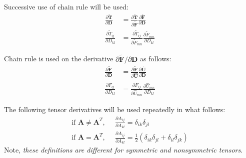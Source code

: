Successive use of chain rule will be used:
\begin{align}
\frac{\partial \tilde{\bm T}}{\partial \bm D} &= \frac{\partial \tilde{\bm T}}{\partial \tilde{\bm F}}\frac{\partial \tilde{\bm F}}{\partial {\bm D}} \\
\label{eq:tanmod}
\frac{\partial \tilde{T}_{ij}}{\partial D_{kl}} &= \frac{\partial \tilde{T}_{ij}}{\partial \tilde{F}_{mn}}\frac{\partial \tilde{F}_{mn}}{\partial D_{kl}}
\end{align}

Chain rule is used on the  derivative $\partial \tilde {\bm F}/\partial {\bm D}$ as follows:
\begin{align}
\frac{\partial \tilde{\bm F}}{\partial {\bm D}} &= \frac{\partial \tilde{\bm F}}{\partial {\hat {\bm U}}}\frac{\partial \hat{\bm U}}{\partial {\bm D}} \\
\frac{\partial \tilde{F}_{ij}}{\partial D_{kl}} &= \frac{\partial \tilde{F}_{ij}}{\partial \hat{U}_{mn}}\frac{\partial \hat{U}_{mn}}{\partial D_{kl}}
\end{align}

The following tensor derivatives will be used repeatedly in what follows:
\begin{align}
\text{if } {\bm A} \neq {\bm A}^T\text{,}\ \ \ &\frac{\partial A_{ij}}{\partial A_{kl}} = \delta_{ik}{\delta_{jl}} \\
\text{if } {\bm A} = {\bm A}^T\text{,}\ \ \ &\frac{\partial A_{ij}}{\partial A_{kl}} = \frac{1}{2}(\delta_{ik}{\delta_{jl}} + \delta_{il}{\delta_{jk}})
\end{align}
Note, \textit{these definitions are different for symmetric and nonsymmetric tensors}.

